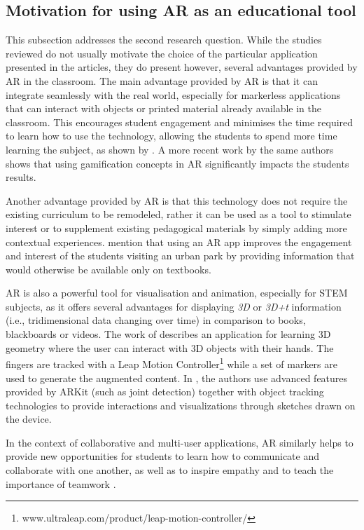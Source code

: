 \subsection{Motivation for using AR as an educational tool}

This subsection addresses the second research question. While the studies reviewed do not usually motivate the choice of the particular application presented in the articles, they do present however, several advantages provided by AR in the classroom. The main advantage provided by AR is that it can integrate seamlessly with the real world, especially for markerless applications that can interact with objects or printed material already available in the classroom. This encourages student engagement and minimises the time required to learn how to use the technology, allowing the students to spend more time learning the subject, as shown by \cite{thamrongrat2019design}. A more recent work by the same authors \cite{233-10.1145/3441000.3441034} shows that using gamification concepts in AR significantly impacts the students results.

Another advantage provided by AR is that this technology does not require the existing curriculum to be remodeled, rather it can be used as a tool to stimulate interest or to supplement existing pedagogical materials by simply adding more contextual experiences. \cite{pombo2018edupark} mention that using an AR app improves the engagement and interest of the students visiting an urban park by providing information that would otherwise be available only on textbooks.

AR is also a powerful tool for visualisation and animation, especially for STEM subjects, as it offers several advantages for displaying \emph{3D} or \emph{3D+t} information (i.e., tridimensional data changing over time) in comparison to books, blackboards or videos. The work of \cite{cao2019hand} describes an application for learning 3D geometry where the user can interact with 3D objects with their hands. The fingers are tracked with a Leap Motion Controller\footnote{www.ultraleap.com/product/leap-motion-controller/} while a set of markers are used to generate the augmented content. In \cite{246-10.1145/3379350.3416155}, the authors use advanced features provided by ARKit (such as joint detection) together with object tracking technologies to provide interactions and visualizations through sketches drawn on the device.

In the context of collaborative and multi-user applications, AR similarly helps to provide new opportunities for students to learn how to communicate and collaborate with one another, as well as to inspire empathy and to teach the importance of teamwork \cite{hill2013classroom}.

